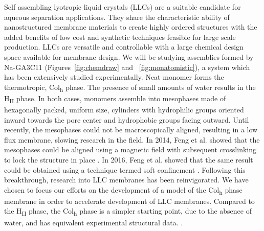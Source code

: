 Self assembling lyotropic liquid crystals (LLCs) are a suitable candidate
for aqueous separation applications. They share the characteristic
ability of nanostructured membrane materials to create highly ordered 
structures with the added benefits of low cost and synthetic techniques
feasible for large scale production\cite{feng_scalable_2014}. LLCs are
versatile and controllable with a large chemical design space available
for membrane design. We will be studying assemblies formed by Na-GA3C11 
(Figures~\ref{fig:chemdraw} and ~\ref{fig:monatomistic}), a system which
has been extensively studied experimentally\cite{smith_ordered_1997,
zhou_supported_2005,resel_h2-phase_2000,feng_scalable_2014,feng_thin_2016}. 
Neat monomer forms the thermotropic, Col\textsubscript{h} phase. The 
presence of small amounts of water results in the H\textsubscript{II} 
phase. In both cases, monomers assemble into mesophases made of 
hexagonally packed, uniform size, cylinders with hydrophilic groups oriented inward
towards the pore center and hydrophobic groups facing outward. Until
recently, the mesophases could not be macroscopically aligned, resulting
in a low flux membrane, slowing research in the field. In 2014, 
Feng et al. showed that the mesophases could be aligned using a magnetic
field with subsequent crosslinking to lock the structure in place
\cite{feng_scalable_2014}. In 2016, Feng et al. showed that the same 
result could be obtained using a technique termed soft confinement
\cite{feng_thin_2016}. Following this breakthrough, research into LLC
membranes has been reinvigorated. We have chosen to focus our efforts 
on the development of a model of the Col\textsubscript{h} phase membrane
in order to accelerate development of LLC membranes.  Compared to the 
H\textsubscript{II} phase, the Col\textsubscript{h} phase is a simpler
starting point, due to the absence of water, and has equivalent 
experimental structural data. 
. 

